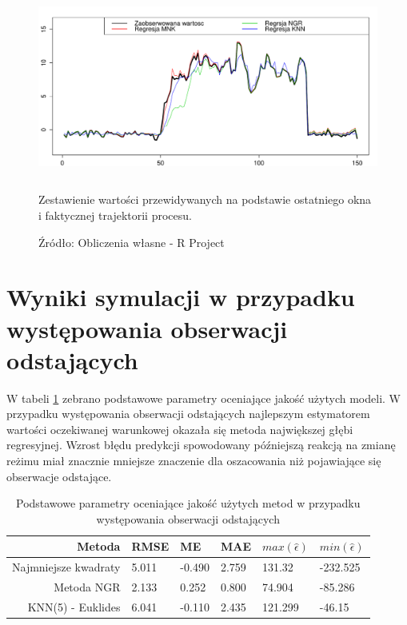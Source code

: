 \documentclass[man,mfu]{mgrwms}
\begin{document}
\begin{figure}[H]
\centering
\includegraphics[width=160mm,height = 60mm]{esval}
\caption{Zestawienie wartości przewidywanych na podstawie ostatniego okna i faktycznej trajektorii procesu.}
\caption*{Źródło: Obliczenia własne - R Project}
\label{fig:odchreg}
\end{figure}

\section{Wyniki symulacji w przypadku występowania obserwacji odstających}

W tabeli \ref{restableout}  zebrano podstawowe parametry oceniające jakość użytych modeli. W przypadku występowania obserwacji odstających najlepszym estymatorem wartości oczekiwanej warunkowej okazała się metoda największej głębi regresyjnej. Wzrost błędu predykcji spowodowany późniejszą reakcją na zmianę reżimu miał znacznie mniejsze znaczenie dla oszacowania niż pojawiające się obserwacje odstające.

\begin{table}[H]
\caption{Podstawowe parametry oceniające jakość użytych metod w przypadku występowania obserwacji odstających}
\label{restableout}

\begin{tabular}{|r|l|l|l|l|l|}
  \hline
  Metoda & RMSE & ME & MAE & $max(\hat{\epsilon})$& $min(\hat{\epsilon})$ \\
  \hline 
  Najmniejsze kwadraty & 5.011 & -0.490 & 2.759 & 131.32 & -232.525\\
  \hline
  Metoda NGR & 2.133 & 0.252 & 0.800 & 74.904 & -85.286\\
  \hline
  KNN(5) - Euklides & 6.041 & -0.110 & 2.435 & 121.299 & -46.15\\
  \hline
\end{tabular} 
\end{table}
\end{document}
